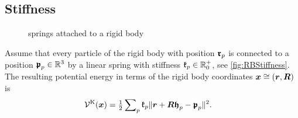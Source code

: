 \subsection{Stiffness}\label{sec:RBStiffness}
\begin{figure}[ht]
 \centering
 
 \caption{springs attached to a rigid body}
 \label{fig:RBStiffness}
\end{figure}
Assume that every particle of the rigid body with position $\boldsymbol{\mathfrak{r}}_{p}$ is connected to a position $\boldsymbol{\mathfrak{p}}_{p} \in \mathbb{R}^3$ by a linear spring with stiffness $\mathfrak{k}_{p} \in \mathbb{R}^{+}_{0}$, see \autoref{fig:RBStiffness}.
The resulting potential energy in terms of the rigid body coordinates $\boldsymbol{x} \cong (\boldsymbol{r}, \boldsymbol{R})$ is
\begin{align}\label{eq:RBStiffnessPotential}
 \mathcal{V}^{\mathrm{K}}(\boldsymbol{x}) &= \tfrac{1}{2} \sum\nolimits_{p} \mathfrak{k}_{p} \| \boldsymbol{r} + \boldsymbol{R} \boldsymbol{\mathfrak{h}}_{p} - \boldsymbol{\mathfrak{p}}_{p} \|_{}^2.
\end{align}


